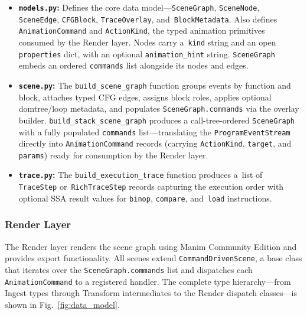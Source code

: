 \begin{itemize}
    \item \textbf{\texttt{models.py}:} Defines the core data model---\texttt{SceneGraph}, \texttt{SceneNode}, \texttt{SceneEdge}, \texttt{CFGBlock}, \texttt{TraceOverlay}, and~\texttt{BlockMetadata}. Also defines \texttt{AnimationCommand} and \texttt{ActionKind}, the typed animation primitives consumed by the Render layer. Nodes carry a~\texttt{kind} string and an open \texttt{properties} dict, with an optional \texttt{animation\_hint} string. \texttt{SceneGraph} embeds an ordered \texttt{commands} list alongside its nodes and edges.

    \item \textbf{\texttt{scene.py}:} The \texttt{build\_scene\_graph} function groups events by function and block, attaches typed CFG edges, assigns block roles, applies optional domtree/loop metadata, and populates \texttt{SceneGraph.commands} via the overlay builder. \texttt{build\_stack\_scene\_graph} produces a call-tree-ordered \texttt{SceneGraph} with a fully populated \texttt{commands} list---translating the \texttt{ProgramEventStream} directly into \texttt{AnimationCommand} records (carrying \texttt{ActionKind}, \texttt{target}, and \texttt{params}) ready for consumption by the Render layer.

    \item \textbf{\texttt{trace.py}:} The \texttt{build\_execution\_trace} function produces a~list of \texttt{TraceStep} or~\texttt{RichTraceStep} records capturing the execution order with optional SSA result values for \texttt{binop}, \texttt{compare}, and~\texttt{load} instructions.
\end{itemize}

\subsubsection{Render Layer}
The Render layer renders the scene graph using Manim Community Edition\cite{manimce} and provides export functionality. All scenes extend \texttt{CommandDrivenScene}, a base class that iterates over the \texttt{SceneGraph.commands} list and dispatches each \texttt{AnimationCommand} to a registered handler. The complete type hierarchy---from Ingest types through Transform intermediates to the Render dispatch classes---is shown in Fig.~\ref{fig:data_model}.

